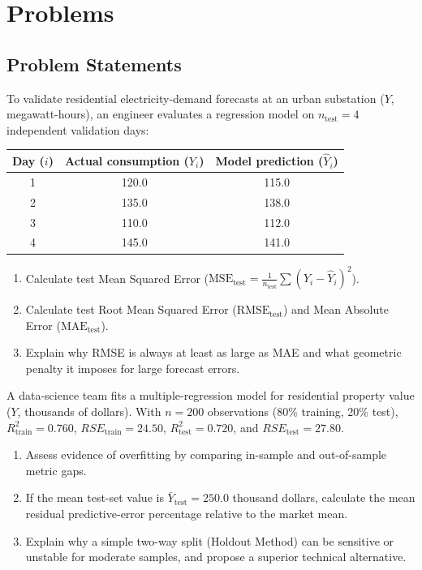 \section*{Problems}

\subsection*{Problem Statements}

\begin{problema}
\label{prob:ca86634}
To validate residential electricity-demand forecasts at an urban substation ($Y$, megawatt-hours), an engineer evaluates a regression model on $n_{\text{test}}=4$ independent validation days:
\begin{center}
\begin{tabular}{ccc}
\hline
\textbf{Day ($i$)} & \textbf{Actual consumption ($Y_i$)} & \textbf{Model prediction ($\hat Y_i$)} \\ \hline
1 & 120.0 & 115.0 \\
2 & 135.0 & 138.0 \\
3 & 110.0 & 112.0 \\
4 & 145.0 & 141.0 \\ \hline
\end{tabular}
\end{center}
\begin{enumerate}
\item Calculate test Mean Squared Error ($\text{MSE}_{\text{test}}=\frac1{n_{\text{test}}}\sum(Y_i-\hat Y_i)^2$).
\item Calculate test Root Mean Squared Error ($\text{RMSE}_{\text{test}}$) and Mean Absolute Error ($\text{MAE}_{\text{test}}$).
\item Explain why RMSE is always at least as large as MAE and what geometric penalty it imposes for large forecast errors.
\end{enumerate}
\end{problema}

\begin{problema}
\label{prob:7d813ee}
A data-science team fits a multiple-regression model for residential property value ($Y$, thousands of dollars). With $n=200$ observations (80\% training, 20\% test), $R^2_{\text{train}}=0.760$, $RSE_{\text{train}}=24.50$, $R^2_{\text{test}}=0.720$, and $RSE_{\text{test}}=27.80$.
\begin{enumerate}
\item Assess evidence of overfitting by comparing in-sample and out-of-sample metric gaps.
\item If the mean test-set value is $\bar Y_{\text{test}}=250.0$ thousand dollars, calculate the mean residual predictive-error percentage relative to the market mean.
\item Explain why a simple two-way split (Holdout Method) can be sensitive or unstable for moderate samples, and propose a superior technical alternative.
\end{enumerate}
\end{problema}

